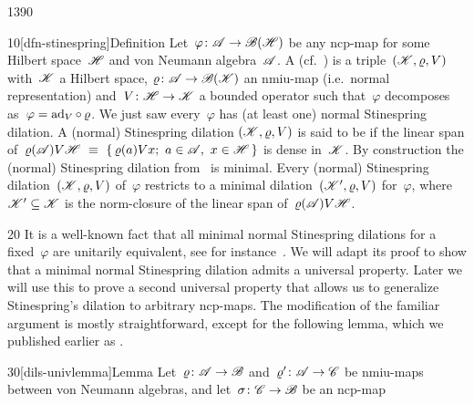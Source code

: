 \begin{parsec}{1390}%
\begin{point}{10}[dfn-stinespring]{Definition}%
Let~$\varphi\colon \mathscr{A} \to \mathscr{B}(\mathscr{H})$
    be any ncp-map
    for some Hilbert space~$\mathscr{H}$ and von Neumann algebra~$\mathscr{A}$.
    A 
        (cf.~\cite[ch.~4]{paulsen})
    is a triple~$(\mathscr{K},\varrho, V)$
    with~$\mathscr{K}$ a Hilbert space,
    $\varrho\colon \mathscr{A} \to \mathscr{B}(\mathscr{K})$ an nmiu-map
        (i.e.~normal representation)
        and~$V\colon \mathscr{H} \to \mathscr{K}$ a bounded operator
        such that~$\varphi$ decomposes as~$\varphi = \mathrm{ad}_V \mathop{\circ} \varrho$.
    We just saw every~$\varphi$ has (at least one)
        normal Stinespring dilation.
    A (normal) Stinespring dilation
$(\mathscr{K},\varrho,V)$ is said to be 
    if the linear span of~$\varrho(\mathscr{A})V\mathscr{H}
        \ \equiv \ \{ \,\varrho(a) Vx; \ a \in \mathscr{A},\ x\in \mathscr{H}\,\}$
is dense in~$\mathscr{K}$.
By construction the (normal) Stinespring dilation
    from~ is minimal.
Every (normal) Stinespring dilation~$(\mathscr{K}, \varrho, V)$
    of~$\varphi$
    restricts to a minimal dilation~$(\mathscr{K}', \varrho,V)$
    for~$\varphi$, where~$\mathscr{K}' \subseteq \mathscr{K}$
    is the norm-closure of the linear span of~$\varrho(\mathscr{A})V\mathscr{H}$.
\end{point}
\begin{point}{20}%
It is a well-known fact that all minimal normal Stinespring dilations
    for a fixed~$\varphi$ are unitarily equivalent,
    see for instance~\cite[prop.~4.2]{paulsen}.
We will adapt its proof to show that a minimal normal Stinespring
    dilation admits a universal property.
Later we will use this to prove a second universal property 
    that allows us to generalize Stinespring's dilation to
    arbitrary ncp-maps.
The modification of the familiar argument
    is mostly straightforward, except for the following lemma,
    which we published earlier as \cite[lem.~11]{wwpaschke}.
\end{point}
\spacingfix{} %
\begin{point}{30}[dils-univlemma]{Lemma}%
Let~$\varrho\colon \mathscr{A} \to \mathscr{B}$ and~$\varrho'\colon \mathscr{A} \to \mathscr{C}$
    be nmiu-maps between von Neumann algebras,
        and let~$\sigma \colon \mathscr{C} \to \mathscr{B}$ be an ncp-map

\end{point}
\end{parsec}
